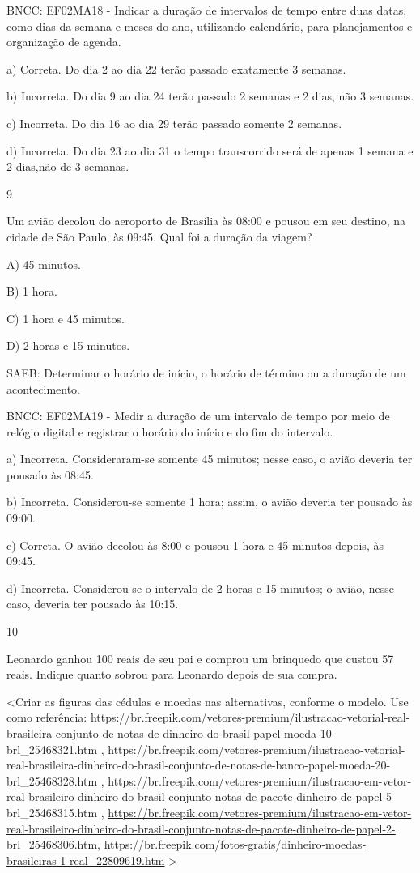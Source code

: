 \begin{escolha}
\begin{escolha}
{{{{BNCC: EF02MA18 - Indicar a duração de intervalos de tempo entre
duas datas, como dias da semana e meses do ano, utilizando calendário,
para planejamentos e organização de agenda.

a) Correta. Do dia 2 ao dia 22 terão passado exatamente 3 semanas.

b) Incorreta. Do dia 9 ao dia 24 terão passado 2 semanas e 2 dias, não 3
semanas.

c) Incorreta. Do dia 16 ao dia 29 terão passado somente 2 semanas.

d) Incorreta. Do dia 23 ao dia 31 o tempo transcorrido será de apenas 1 semana e 2 dias,não de 3
semanas.

\num{9}

Um avião decolou do aeroporto de Brasília às 08:00 e pousou em seu
destino, na cidade de São Paulo, às 09:45. Qual foi a duração da viagem?

A) 45 minutos.

B) 1 hora.

C) 1 hora e 45 minutos.

D) 2 horas e 15 minutos.

SAEB: Determinar o horário de início, o horário de término ou a
duração de um acontecimento.

BNCC: EF02MA19 - Medir a duração de um intervalo de tempo por meio de
relógio digital e registrar o horário do início e do fim do intervalo.

a) Incorreta. Consideraram-se somente 45 minutos; nesse caso, o avião deveria ter pousado
às 08:45.

b) Incorreta. Considerou-se somente 1 hora; assim, o avião deveria ter
pousado às 09:00.

c) Correta. O avião decolou às 8:00 e pousou 1 hora e 45 minutos depois, às 09:45.

d) Incorreta. Considerou-se o intervalo de 2 horas e 15 minutos; o avião, nesse caso, deveria ter
pousado às 10:15.

\num{10}

Leonardo ganhou 100 reais de seu pai e comprou um brinquedo que custou
57 reais. Indique quanto sobrou para Leonardo depois de sua compra.

\textless{}Criar as figuras das cédulas e moedas nas alternativas,
conforme o modelo. Use como referência:
https://br.freepik.com/vetores-premium/ilustracao-vetorial-real-brasileira-conjunto-de-notas-de-dinheiro-do-brasil-papel-moeda-10-brl\_25468321.htm
,
https://br.freepik.com/vetores-premium/ilustracao-vetorial-real-brasileira-dinheiro-do-brasil-conjunto-de-notas-de-banco-papel-moeda-20-brl\_25468328.htm
,
https://br.freepik.com/vetores-premium/ilustracao-em-vetor-real-brasileiro-dinheiro-do-brasil-conjunto-notas-de-pacote-dinheiro-de-papel-5-brl\_25468315.htm
,
\url{https://br.freepik.com/vetores-premium/ilustracao-em-vetor-real-brasileiro-dinheiro-do-brasil-conjunto-notas-de-pacote-dinheiro-de-papel-2-brl_25468306.htm},
\url{https://br.freepik.com/fotos-gratis/dinheiro-moedas-brasileiras-1-real_22809619.htm}
\textgreater{}

}}}}
\end{escolha}
\end{escolha}
